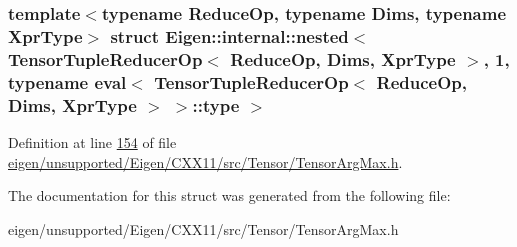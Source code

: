 \subsubsection*{template$<$typename Reduce\+Op, typename Dims, typename Xpr\+Type$>$\newline
struct Eigen\+::internal\+::nested$<$ Tensor\+Tuple\+Reducer\+Op$<$ Reduce\+Op, Dims, Xpr\+Type $>$, 1, typename eval$<$ Tensor\+Tuple\+Reducer\+Op$<$ Reduce\+Op, Dims, Xpr\+Type $>$ $>$\+::type $>$}



Definition at line \hyperlink{eigen_2unsupported_2_eigen_2_c_x_x11_2src_2_tensor_2_tensor_arg_max_8h_source_l00154}{154} of file \hyperlink{eigen_2unsupported_2_eigen_2_c_x_x11_2src_2_tensor_2_tensor_arg_max_8h_source}{eigen/unsupported/\+Eigen/\+C\+X\+X11/src/\+Tensor/\+Tensor\+Arg\+Max.\+h}.



The documentation for this struct was generated from the following file\+:\begin{DoxyCompactItemize}
\item 
eigen/unsupported/\+Eigen/\+C\+X\+X11/src/\+Tensor/\+Tensor\+Arg\+Max.\+h\end{DoxyCompactItemize}
